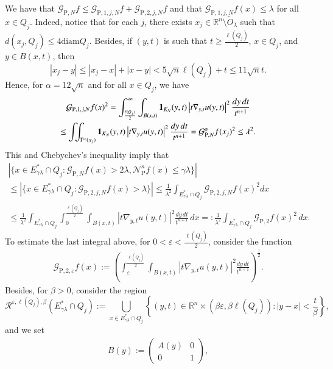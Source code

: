 \documentclass[11pt, a4paper,leqno]{amsart}
\renewcommand{\chi}{{\bf 1}}
\theoremstyle{plain}
\theoremstyle{definition}
\theoremstyle{remark}
\numberwithin{equation}{section}
\def \R{ \mathbb{R} }
\def \pp{ \mathrm{P} }
\def \Gcal { \mathcal{G} }
\def \Ncal { \mathcal{N} }
\def \iint{\int\!\!\!\int}
\begin{document}
We have that $\Gcal_{\pp,N}f\leq \Gcal_{\pp,1,j,N}f+\Gcal_{\pp,2,j,N}f$ and  that $\mathcal{G}_{\pp,1,j,N}f(x)\leq \lambda$ for all $x\in Q_j$. Indeed, notice that for each $j$, there exists $x_j\in \R^n\setminus \widetilde{O}_{\lambda}$ such that $d(x_j,Q_j)\leq 4\textrm{diam}Q_j$. Besides, if $(y,t)$ is such that $t\geq \frac{\ell(Q_j)}{2}$, $x\in Q_j$, and $y\in B(x,t)$, then
$$
|x_j-y|\leq |x_j-x|+|x-y|<5\sqrt{n}\ell(Q_j)+t\leq 11\sqrt{n} t.
$$
Hence, for $\alpha=12\sqrt{n}$ and for all $x\in Q_j$, we have
\begin{multline*}
\mathcal{G}_{\pp,1,j,N}f(x)^2=\int_{\frac{\ell(Q_j)}{2}}^{\infty}\int_{B(x,t)}\chi_{K_N}(y,t)\left|t\nabla_{y,t}u(y,t)\right|^2\frac{dy \, dt}{t^{n+1}}
\\
\leq \iint_{\Gamma^{\alpha}(x_j)}\chi_{K_N}(y,t)\left|t\nabla_{y,t}u(y,t)\right|^2\frac{dy \, dt}{t^{n+1}}
=\Gcal_{\pp,N}^{\alpha}f(x_j)^2\leq \lambda^2.
\end{multline*} 
This and Chebychev's inequality imply that
\begin{multline}\label{GP22}
|\{x\in E^*_{\gamma\lambda}\cap Q_j : \Gcal_{\pp,N}f(x)>2\lambda, \Ncal_{\pp}^{\kappa}f(x)\leq \gamma\lambda\}|
\\
\leq |\{x\in E^*_{\gamma\lambda}\cap Q_j : \mathcal{G}_{\pp,2,j,N}f(x)>\lambda\}|\leq \frac{1}{\lambda^2}\int_{E^*_{\gamma\lambda}\cap Q_j}\mathcal{G}_{\pp,2,j,N}f(x)^2 dx
\\
\leq\frac{1}{\lambda^2}\int_{E^*_{\gamma\lambda}\cap Q_j}\int_0^{\frac{\ell(Q_j)}{2}}\int_{B(x,t)}\left|t\nabla_{y,t}u(y,t)\right|^2\frac{dy \, dt}{t^{n+1}}\, dx=:\frac{1}{\lambda^2}\int_{E^*_{\gamma\lambda}\cap Q_j}\Gcal_{\pp,2}f(x)^2\, dx.
\end{multline}
To estimate the last integral above, for  $0<\varepsilon<\frac{\ell(Q_j)}{2}$, consider the function
\begin{align}\label{def:GP2}
\mathcal{G}_{\pp,2,\varepsilon}f(x):=\left(\int_{\varepsilon}^{\frac{\ell(Q_j)}{2}}\int_{B(x, t)}
\left|t\nabla_{y,t}u(y,t)\right|^ 2\frac{dy \, dt}{t^{n+1}}\right)^{\frac{1}{2}}.
\end{align}
Besides, for $\beta >0$, consider the region
$$
\mathcal{R}^{\varepsilon,\ell(Q_j),\beta}(E^*_{\gamma\lambda}\cap Q_j):=\bigcup_{x\in E^*_{\gamma\lambda}\cap Q_j}\left\{(y,t)\in \mathbb{R}^n\times (\beta\varepsilon, \beta \ell(Q_j)) : |y-x|<\frac{t}{\beta}\right\},
$$
and we set
\begin{align}\label{matrix:B}
B(y):= \left( \begin{array}{cc}
A(y) & 0 \\
0 & 1 \end{array} \right),
\end{align}
\end{document}
